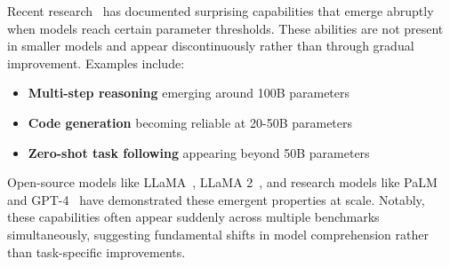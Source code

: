 \noindent
Recent research~\cite{wei2022emergent} has documented surprising capabilities that emerge abruptly when models reach certain parameter thresholds. These abilities are not present in smaller models and appear discontinuously rather than through gradual improvement. Examples include:
\begin{itemize}
    \item \textbf{Multi-step reasoning} emerging around 100B parameters
    \item \textbf{Code generation} becoming reliable at 20-50B parameters
    \item \textbf{Zero-shot task following} appearing beyond 50B parameters
\end{itemize}

\noindent
Open-source models like LLaMA~\cite{touvron2023llama}, LLaMA 2~\cite{touvron2023llama2}, and research models like PaLM~\cite{chowdhery2022palm} and GPT-4~\cite{openai2023gpt4} have demonstrated these emergent properties at scale. Notably, these capabilities often appear suddenly across multiple benchmarks simultaneously, suggesting fundamental shifts in model comprehension rather than task-specific improvements.
